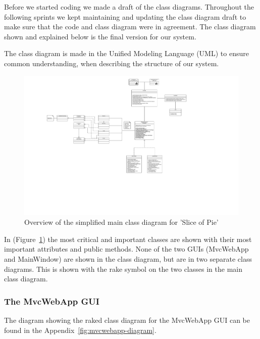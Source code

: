Before we started coding we made a draft of the class diagrams. Throughout the following sprints we kept maintaining and updating the class diagram
draft to make sure that the code and class diagram were in agreement. The class diagram shown and explained below is the final version for our
system.

The class diagram is made in the Unified Modeling Language (UML) to ensure common understanding, when describing the structure of our system.

\begin{figure}[htb]
    \begin{center}
        \includegraphics[width=1\textwidth]{Software_design/graphics/mainClassDiagram.png}
        \caption{Overview of the simplified main class diagram for 'Slice of Pie'}
        \label{fig:design-class_diagram} %
    \end{center}
\end{figure}

In (Figure~\ref{fig:design-class_diagram}) the most critical and important classes are shown with their most important attributes and public methods.
None of the two GUIs (MvcWebApp and MainWindow) are shown in the class diagram, but are in two separate class diagrams. This is shown with the rake
symbol on the two classes in the main class diagram.


\subsubsection{The MvcWebApp GUI}

The diagram showing the raked class diagram for the MvcWebApp GUI can be found in the Appendix~\ref{fig:mvcwebapp-diagram}.

